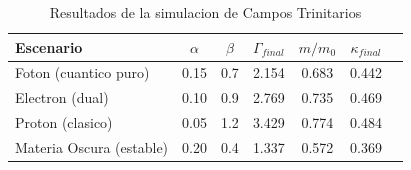 \begin{table}[htbp]
\centering
\caption{Resultados de la simulacion de Campos Trinitarios}
\label{tab:resultados}
\begin{tabular}{lcccccc}
\toprule
Escenario & $\alpha$ & $\beta$ & $\Gamma_{final}$ & $m/m_0$ & $\kappa_{final}$ \\
\midrule
Foton (cuantico puro) & 0.15 & 0.7 & 2.154 & 0.683 & 0.442 \\
Electron (dual) & 0.10 & 0.9 & 2.769 & 0.735 & 0.469 \\
Proton (clasico) & 0.05 & 1.2 & 3.429 & 0.774 & 0.484 \\
Materia Oscura (estable) & 0.20 & 0.4 & 1.337 & 0.572 & 0.369 \\
\bottomrule
\end{tabular}
\end{table}

